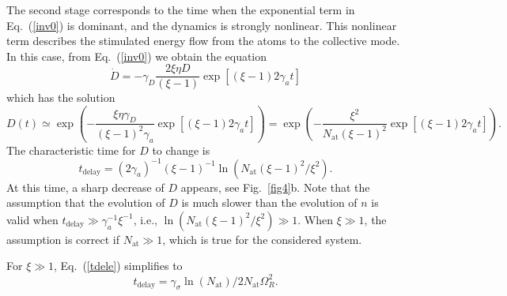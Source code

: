 \documentclass[aps,prapplied,amsmath,amssymb,onecolumn,superscriptaddress,showpacs,floatfix,longbibliography]{revtex4-1}
\begin{document}
The second stage corresponds to the time when the exponential term in Eq.~(\ref{inv0}) is dominant, and the dynamics is strongly nonlinear.
This nonlinear term describes the stimulated energy flow from the atoms to the collective mode.
In this case, from Eq.~(\ref{inv0}) we obtain the equation
\begin{equation} 
\dot D =  - {\gamma _D}\frac{{2\xi \eta D}}{{\left( {\xi  - 1} \right)}} \exp \left[\left( {\xi  - 1} \right) 2 {\gamma _a}t \right] \label{invnl1}
\end{equation}
which has the solution
\begin{equation} 
D(t) \simeq \exp \left(  - \frac{{\xi \eta {\gamma _D}}}{{{\left( {\xi  - 1} \right)}^2}{\gamma _a}}  \exp \left[\left( {\xi  - 1} \right) 2 {\gamma _a}t \right] \right) = \exp \left(  - \frac{{{\xi ^2}}}{{{N_{\text{at}}}{{\left( {\xi  - 1} \right)}^2}}}\exp \left[\left( {\xi  - 1} \right) 2 {\gamma _a}t \right] \right).
\end{equation}
The characteristic time for $D$ to change is 
\begin{equation} 
{t_\text{delay}} = (2\gamma _a)^{ - 1}{\left( {\xi  - 1} \right)^{ - 1}}\ln \left( {{N_{\text{at}}}{{\left( {\xi - 1} \right)}^2}/{\xi ^2}} \right). \label{tdele}
\end{equation}
At this time, a sharp decrease of $D$ appears, see Fig.~\ref{fig4}b.
Note that the assumption that the evolution of $D$ is much slower than the evolution of $n$ is valid when $t_\text{delay} \gg \gamma_a^{-1} \xi^{-1}$, i.e., $\ln \left( {{N_{\text{at}}}{{\left( {\xi  - 1} \right)}^2}/{\xi ^2}} \right) \gg 1$.
When $\xi \gg 1$, the assumption is correct if $N_{\text{at}} \gg 1$, which is true for the considered system.

For $\xi \gg 1$, Eq.~(\ref{tdele}) simplifies to  
\begin{equation} 
{t_{\text{delay}}} = {\gamma _\sigma }\ln \left( {{N_{\text{at}}}} \right)/2{N_{\text{at}}}\Omega _R^2. \label{tdel}
\end{equation}
\end{document}
